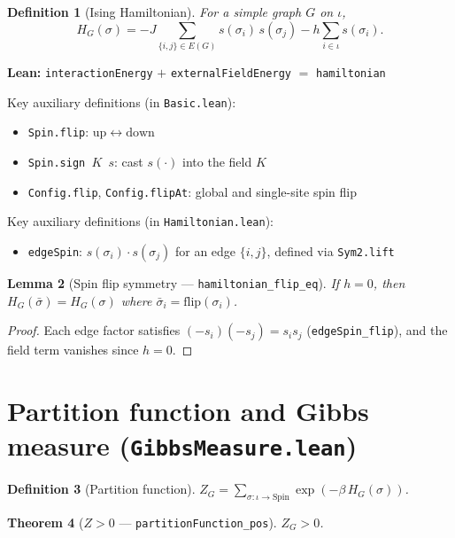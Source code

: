 \documentclass[a4paper,11pt]{article}
\newtheorem{theorem}{Theorem}
\newtheorem{lemma}[theorem]{Lemma}
\newtheorem{definition}[theorem]{Definition}
\begin{document}
\begin{definition}[Ising Hamiltonian]
For a simple graph $G$ on $\iota$,
\[
  H_G(\sigma) = -J \sum_{\{i,j\} \in E(G)} s(\sigma_i)\,s(\sigma_j)
  - h \sum_{i \in \iota} s(\sigma_i).
\]
\end{definition}

\noindent\textbf{Lean:} \texttt{interactionEnergy} $+$
\texttt{externalFieldEnergy} $=$ \texttt{hamiltonian}

Key auxiliary definitions (in \texttt{Basic.lean}):
\begin{itemize}
  \item \texttt{Spin.flip}: $\mathrm{up} \leftrightarrow \mathrm{down}$
  \item \texttt{Spin.sign $K$ $s$}: cast $s(\cdot)$ into the field $K$
  \item \texttt{Config.flip}, \texttt{Config.flipAt}: global and single-site spin flip
\end{itemize}
Key auxiliary definitions (in \texttt{Hamiltonian.lean}):
\begin{itemize}
  \item \texttt{edgeSpin}: $s(\sigma_i) \cdot s(\sigma_j)$ for an edge
    $\{i,j\}$, defined via \texttt{Sym2.lift}
\end{itemize}

\begin{lemma}[Spin flip symmetry --- \texttt{hamiltonian\_flip\_eq}]
If $h = 0$, then $H_G(\bar{\sigma}) = H_G(\sigma)$ where
$\bar{\sigma}_i = \mathrm{flip}(\sigma_i)$.
\end{lemma}

\begin{proof}
Each edge factor satisfies $(-s_i)(-s_j) = s_i s_j$
(\texttt{edgeSpin\_flip}), and the field term vanishes since $h=0$.
\end{proof}

\section{Partition function and Gibbs measure (\texttt{GibbsMeasure.lean})}

\begin{definition}[Partition function]
$Z_G = \sum_{\sigma : \iota \to \mathrm{Spin}} \exp(-\beta\, H_G(\sigma))$.
\end{definition}

\begin{theorem}[$Z > 0$ --- \texttt{partitionFunction\_pos}]
$Z_G > 0$.
\end{theorem}
\end{document}
